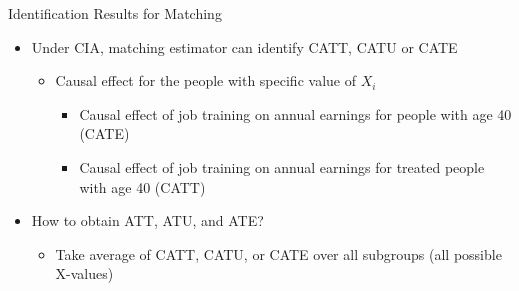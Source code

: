 \documentclass[hyperref={pdfpagelabels=false}]{beamer}
\begin{document}
\begin{frame}{Identification Results for Matching}
	\begin{itemize}
		\item Under CIA, matching estimator can identify CATT, CATU or CATE
		\vspace{0.2cm}
		\begin{itemize}
			\item Causal effect for the people with specific value of $X_{i}$
			\vspace{0.2cm}
					\begin{itemize}
			\item Causal effect of job training on annual earnings for people with age 40 (CATE)
				\vspace{0.2cm}
			\item Causal effect of job training on annual earnings for treated people with age 40 (CATT)
					\end{itemize}
		\end{itemize}
			\vspace{0.2cm}
		\item How to obtain ATT, ATU, and ATE?
			\vspace{0.2cm}
		\begin{itemize}
			\item Take average of CATT, CATU, or CATE over all subgroups (all possible X-values)
		\end{itemize}
	\end{itemize}
\end{frame}
\end{document}
